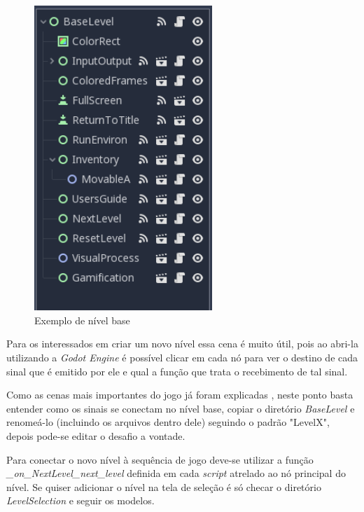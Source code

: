 \begin{figure}[H]
    \includegraphics[width=0.6\textwidth]{../figuras/exemplo_base_level.png}
    \caption{Exemplo de nível base}
\end{figure}

Para os interessados em criar um novo nível essa cena é muito útil, pois ao 
abri-la utilizando a \textit{Godot Engine} é possível clicar em cada nó para ver
o destino de cada sinal que é emitido por ele e qual a função que trata o 
recebimento de tal sinal.

Como as cenas mais importantes do jogo já foram explicadas , neste ponto basta
entender como os sinais se conectam no nível base, copiar o diretório
\textit{BaseLevel} e renomeá-lo (incluindo os arquivos dentro dele)
seguindo o padrão "LevelX", depois pode-se editar o desafio a vontade.

Para conectar o novo nível à sequência de jogo deve-se utilizar a função
\textit{\_on\_NextLevel\_next\_level} definida em cada \textit{script}
atrelado ao nó principal do nível. Se quiser adicionar o nível na tela de 
seleção é só checar o diretório \textit{LevelSelection} e seguir os modelos.